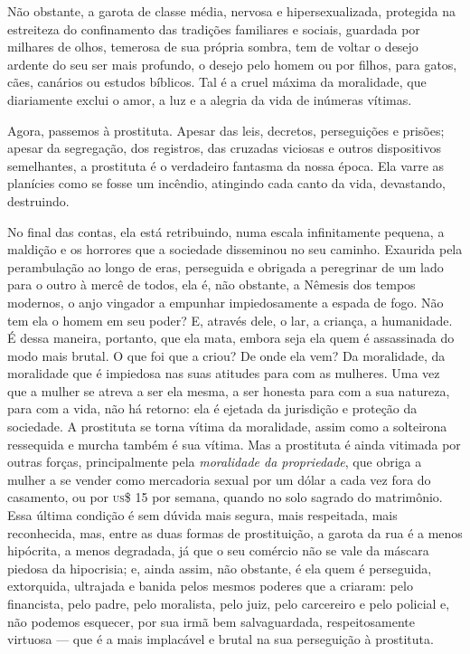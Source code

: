 Não obstante, a garota de classe média, nervosa e hipersexualizada,
protegida na estreiteza do confinamento das tradições familiares e
sociais, guardada por milhares de olhos, temerosa de sua própria sombra, 
tem de voltar o desejo ardente do seu ser mais profundo, o desejo pelo
homem ou por filhos, para gatos, cães, canários ou estudos
bíblicos. Tal é a cruel máxima da moralidade, que diariamente exclui o
amor, a luz e a alegria da vida de inúmeras vítimas.

Agora, passemos à prostituta. Apesar das leis, decretos, perseguições e
prisões; apesar da segregação, dos registros, das cruzadas viciosas e
outros dispositivos semelhantes, a prostituta é o verdadeiro fantasma da
nossa época. Ela varre as planícies como se fosse um incêndio, atingindo
cada canto da vida, devastando, destruindo.

No final das contas, ela está retribuindo, numa escala infinitamente pequena,
a maldição e os horrores que a sociedade disseminou no seu caminho.
Exaurida pela perambulação ao longo de eras, perseguida e obrigada a
peregrinar de um lado para o outro à mercê de todos, ela é, não
obstante, a Nêmesis dos tempos modernos, o anjo vingador a empunhar
impiedosamente a espada de fogo. Não tem ela o homem em seu poder? E,
através dele, o lar, a criança, a humanidade. É dessa maneira, portanto,
que ela mata, embora seja ela quem é assassinada do modo mais brutal. O
que foi que a criou? De onde ela vem? Da moralidade, da moralidade que é
impiedosa nas suas atitudes para com as mulheres. Uma vez que a mulher
se atreva a ser ela mesma, a ser honesta para com a sua natureza, para
com a vida, não há retorno: ela é ejetada da jurisdição e proteção da
sociedade. A prostituta se torna vítima da moralidade, assim como a
solteirona ressequida e murcha também é sua vítima. Mas a prostituta é
ainda vitimada por outras forças, principalmente pela \textit{moralidade da
propriedade}, que obriga a mulher a se vender como mercadoria sexual por
um dólar a cada vez fora do casamento, ou por \textsc{us}\$ 15 por
semana, quando no solo sagrado do matrimônio. Essa última condição é sem
dúvida mais segura, mais respeitada, mais reconhecida, mas, entre as
duas formas de prostituição, a garota da rua é a menos hipócrita, a
menos degradada, já que o seu comércio não se vale da máscara piedosa da
hipocrisia; e, ainda assim, não obstante, é ela quem é perseguida,
extorquida, ultrajada e banida pelos mesmos poderes que a criaram: pelo
financista, pelo padre, pelo moralista, pelo juiz, pelo carcereiro e
pelo policial e, não podemos esquecer, por sua irmã bem salvaguardada,
respeitosamente virtuosa --- que é a mais implacável e brutal na sua
perseguição à prostituta.

